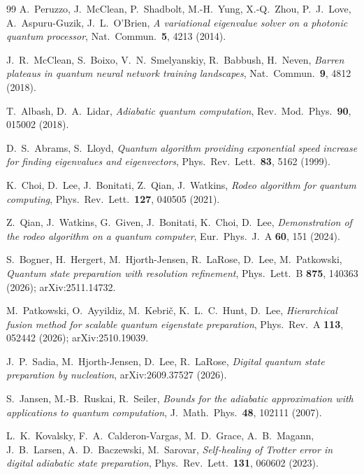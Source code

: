 \documentclass[
  aps,            %
  prc,            %
  reprint,        %
  superscriptaddress,
  floatfix,
  nofootinbib
]{revtex4-2}
\begin{document}
\begin{thebibliography}{99}
A.~Peruzzo, J.~McClean, P.~Shadbolt, M.-H.~Yung, X.-Q.~Zhou, P.~J.~Love,
A.~Aspuru-Guzik, J.~L.~O'Brien,
\textit{A variational eigenvalue solver on a photonic quantum processor},
Nat.\ Commun.\ \textbf{5}, 4213 (2014).

J.~R.~McClean, S.~Boixo, V.~N.~Smelyanskiy, R.~Babbush, H.~Neven,
\textit{Barren plateaus in quantum neural network training landscapes},
Nat.\ Commun.\ \textbf{9}, 4812 (2018).

T.~Albash, D.~A.~Lidar,
\textit{Adiabatic quantum computation},
Rev.\ Mod.\ Phys.\ \textbf{90}, 015002 (2018).

D.~S.~Abrams, S.~Lloyd,
\textit{Quantum algorithm providing exponential speed increase for finding
eigenvalues and eigenvectors},
Phys.\ Rev.\ Lett.\ \textbf{83}, 5162 (1999).

K.~Choi, D.~Lee, J.~Bonitati, Z.~Qian, J.~Watkins,
\textit{Rodeo algorithm for quantum computing},
Phys.\ Rev.\ Lett.\ \textbf{127}, 040505 (2021).

Z.~Qian, J.~Watkins, G.~Given, J.~Bonitati, K.~Choi, D.~Lee,
\textit{Demonstration of the rodeo algorithm on a quantum computer},
Eur.\ Phys.\ J.\ A \textbf{60}, 151 (2024).

S.~Bogner, H.~Hergert, M.~Hjorth-Jensen, R.~LaRose, D.~Lee, M.~Patkowski,
\textit{Quantum state preparation with resolution refinement},
Phys.\ Lett.\ B \textbf{875}, 140363 (2026); arXiv:2511.14732.

M.~Patkowski, O.~Ayyildiz, M.~Kebri\v{c}, K.~L.~C.~Hunt, D.~Lee,
\textit{Hierarchical fusion method for scalable quantum eigenstate preparation},
Phys.\ Rev.\ A \textbf{113}, 052442 (2026); arXiv:2510.19039.

J.~P.~Sadia, M.~Hjorth-Jensen, D.~Lee, R.~LaRose,
\textit{Digital quantum state preparation by nucleation},
arXiv:2609.37527 (2026).

S.~Jansen, M.-B.~Ruskai, R.~Seiler,
\textit{Bounds for the adiabatic approximation with applications to quantum
computation},
J.\ Math.\ Phys.\ \textbf{48}, 102111 (2007).

L.~K.~Kovalsky, F.~A.~Calderon-Vargas, M.~D.~Grace, A.~B.~Magann,
J.~B.~Larsen, A.~D.~Baczewski, M.~Sarovar,
\textit{Self-healing of Trotter error in digital adiabatic state preparation},
Phys.\ Rev.\ Lett.\ \textbf{131}, 060602 (2023).


\end{thebibliography}
\end{document}
